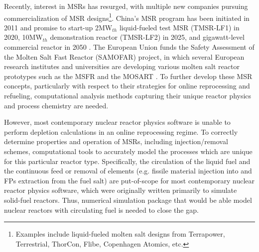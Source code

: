 Recently, interest in \glspl{MSR} has resurged, with multiple new companies 
pursuing commercialization of \gls{MSR} designs\footnote{Examples 
include liquid-fueled molten salt designs from Terrapower, Terrestrial, 
ThorCon, Flibe, Copenhagen Atomics, etc.}. China's \gls{MSR} program 
has been initiated in 2011 and promise to start-up 2MW$_{th}$ 
liquid-fueled test \gls{MSR} (TMSR-LF1) in 2020, 10MW$_{th}$ 
demonstration reactor (TMSR-LF2) in 2025, and gigawatt-level 
commercial reactor in 2050 \cite{zhang_review_2018}. The European 
Union funds the Safety Assessment of the Molten Salt Fast Reactor 
(SAMOFAR) project, in which several European research institutes and 
universities are developing various molten salt reactor prototypes 
such as the \gls{MSFR} \cite{fiorina_molten_2013} and the \gls{MOSART} 
\cite{ignatiev_molten_2014}.
To further develop these \gls{MSR} concepts, particularly with respect 
to their strategies for online reprocessing and refueling, 
computational analysis methods capturing their unique reactor physics 
and process chemistry are needed.

However, most contemporary nuclear reactor physics software is unable 
to perform depletion calculations in an online reprocessing regime. 
To correctly determine properties and operation of \glspl{MSR}, 
including injection/removal schemes, computational tools to accurately 
model the processes which are unique for this particular reactor type. Specifically, the circulation of the liquid fuel and the continuous 
feed or removal of elements (e.g. fissile material injection into 
and \glspl{FP} extraction from the fuel salt) are put-of-scope for 
most contemporary nuclear reactor physics software, which were 
originally written primarily to simulate solid-fuel reactors. 
Thus, numerical simulation package that would be able model nuclear 
reactors with circulating fuel is needed to close the gap.

